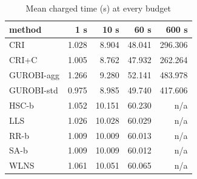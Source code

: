 \begin{table}[htbp]
\centering
\small
\caption{Mean charged time (s) at every budget}
\label{tab:equal_budgets_1s_to_600s_time_by_budget}
\begin{tabular}{lrrrr}
\toprule
method & 1 s & 10 s & 60 s & 600 s \\
\midrule
CRI & 1.028 & 8.904 & 48.041 & 296.306 \\
CRI+C & 1.005 & 8.762 & 47.932 & 262.264 \\
GUROBI-agg & 1.266 & 9.280 & 52.141 & 483.978 \\
GUROBI-std & 0.975 & 8.985 & 49.740 & 417.606 \\
HSC-b & 1.052 & 10.151 & 60.230 & n/a \\
LLS & 1.026 & 10.028 & 60.029 & n/a \\
RR-b & 1.009 & 10.009 & 60.013 & n/a \\
SA-b & 1.009 & 10.009 & 60.012 & n/a \\
WLNS & 1.061 & 10.051 & 60.065 & n/a \\
\bottomrule
\end{tabular}
\end{table}
